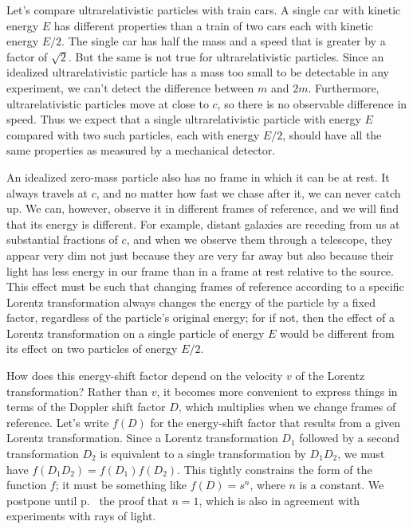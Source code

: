 Let's compare ultrarelativistic particles with train cars. A single car with kinetic energy $E$ has
different properties than a train of two cars each with kinetic energy $E/2$. The single car has
half the mass and a speed that is greater by a factor of $\sqrt{2}$. But the same is not true
for ultrarelativistic particles. Since an idealized ultrarelativistic particle has a mass too
small to be detectable in any experiment, we can't detect the difference between $m$ and $2m$.
Furthermore, ultrarelativistic particles move at close to $c$, so there is no observable
difference in speed. Thus we expect that a single ultrarelativistic particle with energy $E$
compared with  two such particles, each with energy $E/2$,
should have all the same properties as measured by a mechanical detector.

An idealized zero-mass particle also has no frame in which it can be at rest. It
always travels at $c$, and no matter how fast we chase after it, we can never catch up.
We can, however, observe it in different frames of reference, and we will find that its
energy is different. For example, distant galaxies are receding from us at substantial fractions
of $c$, and when we observe them through a telescope, they appear very dim not just because they are very
far away but also because their light has less energy in our frame than in a frame at rest
relative to the source. This effect must be such that changing frames of reference according
to a specific Lorentz transformation always changes the energy of the particle by a fixed factor,
regardless of the particle's original energy;
for if not, then the effect of a Lorentz transformation on a single particle of energy $E$
would be different from its effect on two particles of energy $E/2$.

How does this energy-shift factor depend on the velocity $v$ of the Lorentz transformation?
Rather than $v$, it becomes more convenient to express things in terms of the Doppler shift factor $D$,
which multiplies when we change frames of reference.
Let's write $f(D)$ for the energy-shift factor that results from a given Lorentz transformation.
Since a Lorentz transformation $D_1$ followed by a second transformation $D_2$ is equivalent
to a single transformation by $D_1D_2$, we must have $f(D_1D_2)=f(D_1)f(D_2)$. This tightly
constrains the form of the function $f$; it must be something like $f(D)=s^n$, where $n$
is a constant. We postpone until p.~\pageref{pesky-exponent-proof} the proof that $n=1$, which is also in agreement with experiments with rays of light.\label{pesky-exponent-claim}

